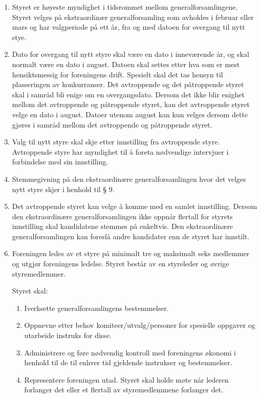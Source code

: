 \documentclass[a4paper,11pt,titlepage]{article}
\begin{document}
\begin{enumerate}

\item Styret er høyeste myndighet i tidsrommet mellom generalforsamlingene. Styret velges på ekstraordinær generalforsamling som avholdes i februar eller mars og har valgperiode på ett år, fra og med datoen for overgang til nytt stye. 

\item Dato for overgang til nytt styre skal være en dato i inneværende år, og skal normalt være en dato i august. Datoen skal settes etter hva som er mest hensiktsmessig for foreningens drift. Spesielt skal det tas hensyn til plasseringen av konkurranser. Det avtroppende og det påtroppende styret skal i samråd bli enige om en overgangsdato. Dersom det ikke blir enighet mellom det avtroppende og påtroppende styret, kan det avtroppende styret velge en dato i august. Datoer utenom august kan kun velges dersom dette gjøres i samråd mellom det avtroppende og påtroppende styret.

\item Valg til nytt styre skal skje etter innstilling fra avtroppende styre. Avtroppende styre har myndighet til å foreta nødvendige intervjuer i forbindelse med sin innstilling.

\item Stemmegivning på den ekstraordinære generalforsamlingen hvor det velges nytt styre skjer i henhold til § 9.

\item Det avtroppende styret kan velge å komme med en samlet innstilling. Dersom den ekstraordinære generalforsamlingen ikke oppnår flertall for styrets innstilling skal kandidatene stemmes på enkeltvis. Den ekstraordinære generalforsamlingen kan foreslå andre kandidater enn de styret har innstilt.

\item Foreningen ledes av et styre på minimalt tre og maksimalt seks medlemmer og utgjør foreningens ledelse. Styret består av en styreleder og øvrige styremedlemmer. 

Styret skal:
\begin{enumerate}
\item Iverksette generalforsamlingens bestemmelser.
\item Oppnevne etter behov komiteer/utvalg/personer for spesielle oppgaver og utarbeide instruks for disse.
\item Administrere og føre nødvendig kontroll med foreningens økonomi i henhold til de til enhver tid gjeldende instrukser og bestemmelser.
\item  Representere foreningen utad. Styret skal holde møte når lederen forlanger det eller et flertall av styremedlemmene forlanger det.
\end{enumerate}


\end{enumerate}
\end{document}

